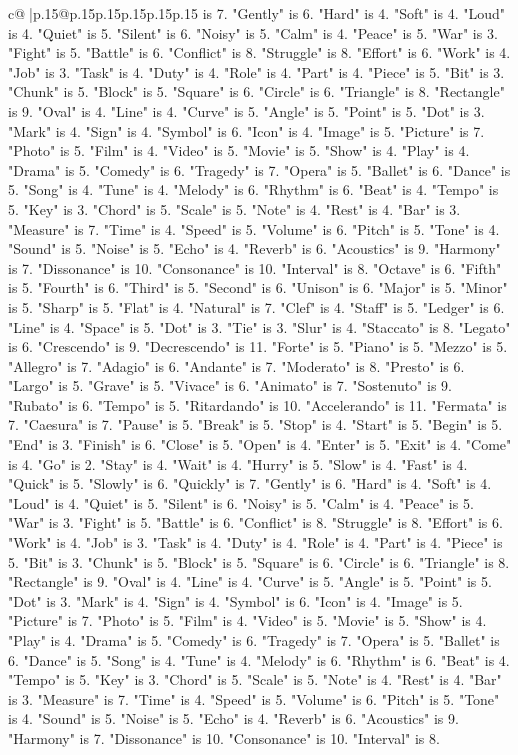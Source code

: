 \documentclass{article}
\begin{document}
{\begin{supertabular}{c@{$\;$}|p{.15\linewidth}@{}p{.15\linewidth}p{.15\linewidth}p{.15\linewidth}p{.15\linewidth}p{.15\linewidth}}
{{{is 7. "Gently" is 6. "Hard" is 4. "Soft" is 4. "Loud" is 4. "Quiet" is 5. "Silent" is 6. "Noisy" is 5. "Calm" is 4. "Peace" is 5. "War" is 3. "Fight" is 5. "Battle" is 6. "Conflict" is 8. "Struggle" is 8. "Effort" is 6. "Work" is 4. "Job" is 3. "Task" is 4. "Duty" is 4. "Role" is 4. "Part" is 4. "Piece" is 5. "Bit" is 3. "Chunk" is 5. "Block" is 5. "Square" is 6. "Circle" is 6. "Triangle" is 8. "Rectangle" is 9. "Oval" is 4. "Line" is 4. "Curve" is 5. "Angle" is 5. "Point" is 5. "Dot" is 3. "Mark" is 4. "Sign" is 4. "Symbol" is 6. "Icon" is 4. "Image" is 5. "Picture" is 7. "Photo" is 5. "Film" is 4. "Video" is 5. "Movie" is 5. "Show" is 4. "Play" is 4. "Drama" is 5. "Comedy" is 6. "Tragedy" is 7. "Opera" is 5. "Ballet" is 6. "Dance" is 5. "Song" is 4. "Tune" is 4. "Melody" is 6. "Rhythm" is 6. "Beat" is 4. "Tempo" is 5. "Key" is 3. "Chord" is 5. "Scale" is 5. "Note" is 4. "Rest" is 4. "Bar" is 3. "Measure" is 7. "Time" is 4. "Speed" is 5. "Volume" is 6. "Pitch" is 5. "Tone" is 4. "Sound" is 5. "Noise" is 5. "Echo" is 4. "Reverb" is 6. "Acoustics" is 9. "Harmony" is 7. "Dissonance" is 10. "Consonance" is 10. "Interval" is 8. "Octave" is 6. "Fifth" is 5. "Fourth" is 6. "Third" is 5. "Second" is 6. "Unison" is 6. "Major" is 5. "Minor" is 5. "Sharp" is 5. "Flat" is 4. "Natural" is 7. "Clef" is 4. "Staff" is 5. "Ledger" is 6. "Line" is 4. "Space" is 5. "Dot" is 3. "Tie" is 3. "Slur" is 4. "Staccato" is 8. "Legato" is 6. "Crescendo" is 9. "Decrescendo" is 11. "Forte" is 5. "Piano" is 5. "Mezzo" is 5. "Allegro" is 7. "Adagio" is 6. "Andante" is 7. "Moderato" is 8. "Presto" is 6. "Largo" is 5. "Grave" is 5. "Vivace" is 6. "Animato" is 7. "Sostenuto" is 9. "Rubato" is 6. "Tempo" is 5. "Ritardando" is 10. "Accelerando" is 11. "Fermata" is 7. "Caesura" is 7. "Pause" is 5. "Break" is 5. "Stop" is 4. "Start" is 5. "Begin" is 5. "End" is 3. "Finish" is 6. "Close" is 5. "Open" is 4. "Enter" is 5. "Exit" is 4. "Come" is 4. "Go" is 2. "Stay" is 4. "Wait" is 4. "Hurry" is 5. "Slow" is 4. "Fast" is 4. "Quick" is 5. "Slowly" is 6. "Quickly" is 7. "Gently" is 6. "Hard" is 4. "Soft" is 4. "Loud" is 4. "Quiet" is 5. "Silent" is 6. "Noisy" is 5. "Calm" is 4. "Peace" is 5. "War" is 3. "Fight" is 5. "Battle" is 6. "Conflict" is 8. "Struggle" is 8. "Effort" is 6. "Work" is 4. "Job" is 3. "Task" is 4. "Duty" is 4. "Role" is 4. "Part" is 4. "Piece" is 5. "Bit" is 3. "Chunk" is 5. "Block" is 5. "Square" is 6. "Circle" is 6. "Triangle" is 8. "Rectangle" is 9. "Oval" is 4. "Line" is 4. "Curve" is 5. "Angle" is 5. "Point" is 5. "Dot" is 3. "Mark" is 4. "Sign" is 4. "Symbol" is 6. "Icon" is 4. "Image" is 5. "Picture" is 7. "Photo" is 5. "Film" is 4. "Video" is 5. "Movie" is 5. "Show" is 4. "Play" is 4. "Drama" is 5. "Comedy" is 6. "Tragedy" is 7. "Opera" is 5. "Ballet" is 6. "Dance" is 5. "Song" is 4. "Tune" is 4. "Melody" is 6. "Rhythm" is 6. "Beat" is 4. "Tempo" is 5. "Key" is 3. "Chord" is 5. "Scale" is 5. "Note" is 4. "Rest" is 4. "Bar" is 3. "Measure" is 7. "Time" is 4. "Speed" is 5. "Volume" is 6. "Pitch" is 5. "Tone" is 4. "Sound" is 5. "Noise" is 5. "Echo" is 4. "Reverb" is 6. "Acoustics" is 9. "Harmony" is 7. "Dissonance" is 10. "Consonance" is 10. "Interval" is 8. }}}
\end{supertabular}}
\end{document}
